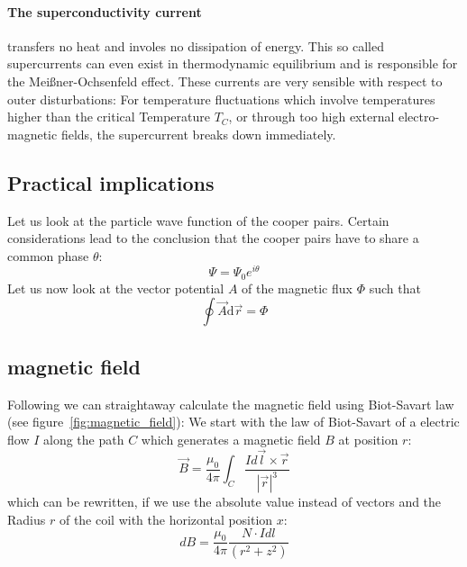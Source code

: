 \paragraph{The superconductivity current} transfers no heat and involes
 no dissipation of energy. This 
so called supercurrents can even exist in thermodynamic equilibrium and
is responsible for the Meißner-Ochsenfeld effect. These currents are very
sensible with respect to outer disturbations: For temperature fluctuations
which involve temperatures higher than the critical Temperature $T_C$, 
or through too high external electro-magnetic fields, the supercurrent
breaks down immediately. 
\subsection{Practical implications}
Let us look at the particle wave function of the cooper pairs. Certain
considerations\cite{Landau} lead to the conclusion that the cooper pairs
have to share a common phase $\theta$:  
\begin{equation}
\Psi = \Psi_0 e^{i\theta}
\end{equation}
Let us now look at the vector potential $A$ of the 
magnetic flux $\Phi$ such that 
\begin{equation}
\oint \vec{A} \mathrm{d} \vec{r}  = \Phi
\end{equation} 
\subsection{magnetic field}
Following we can straightaway calculate the magnetic field using
Biot-Savart law (see figure~\ref{fig:magnetic_field}):
We start with the law of Biot-Savart of a electric flow $I$ along the path $C$ which generates
a magnetic field $B$ at position $r$:
\begin{equation}
    \vec{B} = \frac{\mu_0}{4\pi} \int_{C} \frac{I d\vec{l} \times \vec{r}}{|\vec{r}|^3} 
\end{equation}
which can be rewritten, if we use the absolute value instead of vectors and the Radius $r$ of the
coil with the horizontal position $x$:
\begin{equation}
    dB = \frac{\mu_0}{4\pi} \frac{N \cdot I dl}{(r^2 + z^2)} 
\end{equation}

